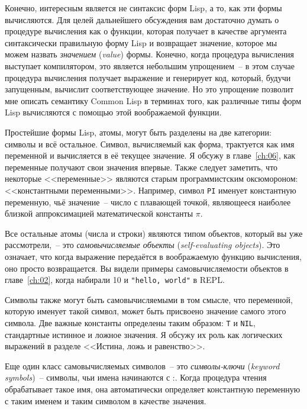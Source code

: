 Конечно, интересным является не синтаксис форм Lisp, а то, как эти формы вычисляются. Для
целей дальнейшего обсуждения вам достаточно думать о процедуре вычисления как о функции,
которая получает в качестве аргумента синтаксически правильную форму Lisp и возвращает
значение, которое мы можем назвать \textit{значением} (\textit{value}) формы. Конечно,
когда процедура вычисления выступает компилятором, это является небольшим упрощением~-- в
этом случае процедура вычисления получает выражение и генерирует код, который, будучи
запущенным, вычислит соответствующее значение. Но это упрощение позволит мне описать
семантику Common Lisp в терминах того, как различные типы форм Lisp вычисляются с помощью
этой воображаемой функции.

Простейшие формы Lisp, атомы, могут быть разделены на две категории: символы и всё
остальное. Символ, вычисляемый как форма, трактуется как имя переменной и вычисляется в её
текущее значение. Я обсужу в главе~\ref{ch:06}, как
переменные получают свои значения впервые. Также следует заметить, что некоторые
<<переменные>> являются старым программистским оксюмороном: <<константными
переменными>>. Например, символ \lstinline{PI} именует константную переменную, чьё
значение~-- число с плавающей точкой, являющееся наиболее близкой аппроксимацией
математической константы $\pi$.

Все остальные атомы (числа и строки) являются типом объектов, который вы уже
рассмотрели,~-- это \textit{самовычисляемые объекты} (\textit{self-evaluating
  objects}). Это означает, что когда выражение передаётся в воображаемую функцию
вычисления, оно просто возвращается. Вы видели примеры самовычисляемости объектов в
главе~\ref{ch:02}, когда набирали 10 и \lstinline{"hello, world"} в REPL.

Символы также могут быть самовычисляемыми в том смысле, что переменной, которую именует
такой символ, может быть присвоено значение самого этого символа. Две важные константы
определены таким образом: \lstinline{T} и \lstinline{NIL}, стандартные истинное и ложное
значения. Я обсужу их роль как логических выражений в разделе <<Истина, ложь и равенство>>.

Еще один класс самовычисляемых символов~-- это \textit{символы-ключи} (\textit{keyword
  symbols})~-- символы, чьи имена начинаются с :. Когда процедура чтения обрабатывает
такое имя, она автоматически определяет константную переменную с таким именем и таким
символом в качестве значения.

